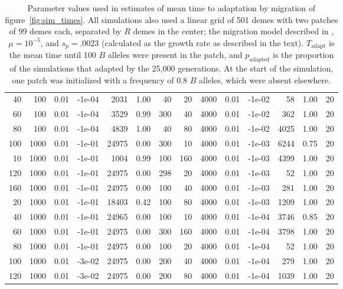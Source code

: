 \begin{table}[ht]
{\begin{tabular}{|rrrrrrr||rrrrrrr|}
  40 & 100 & 0.01 & -1e-04 & 2031 & 1.00 & 40 & 20 & 4000 & 0.01 & -1e-02 & 58 & 1.00 & 20 \\ 
  60 & 100 & 0.01 & -1e-04 & 3529 & 0.99 & 300 & 40 & 4000 & 0.01 & -1e-02 & 362 & 1.00 & 20 \\ 
  80 & 100 & 0.01 & -1e-04 & 4839 & 1.00 & 40 & 80 & 4000 & 0.01 & -1e-02 & 4025 & 1.00 & 20 \\ 
  100 & 1000 & 0.01 & -1e-01 & 24975 & 0.00 & 300 & 10 & 4000 & 0.01 & -1e-03 & 6244 & 0.75 & 20 \\ 
  10 & 1000 & 0.01 & -1e-01 & 1004 & 0.99 & 100 & 160 & 4000 & 0.01 & -1e-03 & 4399 & 1.00 & 20 \\ 
  120 & 1000 & 0.01 & -1e-01 & 24975 & 0.00 & 298 & 20 & 4000 & 0.01 & -1e-03 & 52 & 1.00 & 20 \\ 
  160 & 1000 & 0.01 & -1e-01 & 24975 & 0.00 & 100 & 40 & 4000 & 0.01 & -1e-03 & 281 & 1.00 & 20 \\ 
  20 & 1000 & 0.01 & -1e-01 & 18403 & 0.42 & 100 & 80 & 4000 & 0.01 & -1e-03 & 1209 & 1.00 & 20 \\ 
  40 & 1000 & 0.01 & -1e-01 & 24965 & 0.00 & 100 & 10 & 4000 & 0.01 & -1e-04 & 3746 & 0.85 & 20 \\ 
  60 & 1000 & 0.01 & -1e-01 & 24975 & 0.00 & 300 & 160 & 4000 & 0.01 & -1e-04 & 3798 & 1.00 & 20 \\ 
  80 & 1000 & 0.01 & -1e-01 & 24975 & 0.00 & 100 & 20 & 4000 & 0.01 & -1e-04 & 52 & 1.00 & 20 \\ 
  100 & 1000 & 0.01 & -3e-02 & 24975 & 0.00 & 200 & 40 & 4000 & 0.01 & -1e-04 & 279 & 1.00 & 20 \\ 
  120 & 1000 & 0.01 & -3e-02 & 24975 & 0.00 & 200 & 80 & 4000 & 0.01 & -1e-04 & 1039 & 1.00 & 20 \\ 
   \hline
\end{tabular}
}
\caption{
            Parameter values used in estimates of mean time to adaptation by migration of figure~\ref{fig:sim_times}.
            All simulations also used a linear grid of 501 demes with two patches of 99 demes each,
            separated by $R$ demes in the center;
            the migration model described in ,
            $\mu=10^{-5}$, and $s_p=.0023$ (calculated as the growth rate as described in the text).
            $T_\text{adapt}$ is the mean time until 100 $B$ alleles were present in the patch,
            and $p_\text{adapted}$ is the proportion of the simulations that adapted by the 25,000 generations.
            At the start of the simulation, one patch was initialized with a frequency of 0.8 $B$ alleles, which were absent elsewhere.
            } 
\label{stab:migration_params}
\end{table}
